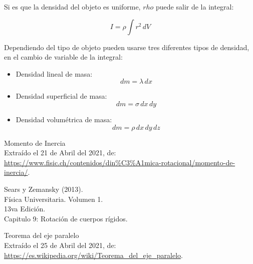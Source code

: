 \documentclass[letter,twoside,11pt]{article}
\begin{document}
Si es que la densidad del objeto es uniforme, $rho$ puede salir de la integral:

\begin{equation}
    I = \rho \int r^2\, dV
\end{equation}

Dependiendo del tipo de objeto pueden usarse tres diferentes tipos de densidad,
en el cambio de variable de la integral:

\begin{itemize}
\item Densidad lineal de masa:
\begin{equation*}
    dm = \lambda\, dx
\end{equation*}

\item Densidad superficial de masa:
\begin{equation*}
    dm = \sigma\, dx\, dy
\end{equation*}

\item Densidad volumétrica de masa:
\begin{equation*}
    dm = \rho\, dx\, dy\, dz
\end{equation*}

\end{itemize}

\begin{thebibliography}{99}

 Momento de Inercia \\
Extraído el 21 de Abril del 2021, de: \\
\url{https://www.fisic.ch/contenidos/din%C3%A1mica-rotacional/momento-de-inercia/}.
 
 Sears y Zemansky (2013).\\
Física Universitaria. Volumen 1.\\
13va Edición.\\
Capitulo 9: Rotación de cuerpos rígidos.

 Teorema del eje paralelo \\
Extraído el 25 de Abril del 2021, de: \\
\url{https://es.wikipedia.org/wiki/Teorema_del_eje_paralelo}.

\end{thebibliography}
\end{document}
